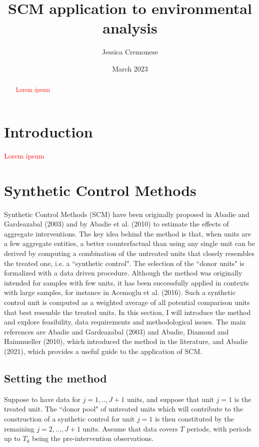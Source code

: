 \documentclass[12pt,a4paper,draft]{article}
\begin{document}
\begin{titlepage}
\title{SCM application to environmental analysis}
\author{Jessica Cremonese}
\date{March 2023}
\maketitle
\end{titlepage}

\tableofcontents

\newpage
\begin{abstract}
    \textcolor{red}{Lorem ipsum}
\end{abstract}
\newpage


\section{Introduction}
\textcolor{red}{Lorem ipsum}




\section{Synthetic Control Methods}
Synthetic Control Methods (SCM) have been originally proposed in Abadie and Gardeazabal 
(2003) and by Abadie et al. (2010) to estimate the effects of aggregate interventions.
The key idea behind the method is that, when units are a few aggregate entities, 
a better counterfactual than using any single unit can be derived by computing a 
combination of the untreated units that closely resembles the treated one, i.e. 
a ``synthetic control". The selection of the ``donor units" is formalized with a data
driven procedure.
Although the method was originally intended for samples with few units, it has been 
successfully applied in contexts with large samples, for instance in Acemoglu et 
al. (2016).
Such a synthetic control unit is computed as a weighted average of all potential 
comparison units that best resemble the treated units. In this section, I will 
introduce the method and explore feasibility, data requirements and methodological 
issues. 
The main references are Abadie and Gardeazabal (2003) and Abadie, Diamond and 
Hainmueller (2010), which introduced the method in the literature, and Abadie 
(2021), which provides a useful guide to the application of SCM.

\subsection{Setting the method}
Suppose to have data for $j=1,..,J+1$ units, and suppose that unit $j=1$ is the 
treated unit. The ``donor pool" of untreated units which will contribute to the 
construction of a synthetic control for unit $j=1$ is then constituted by the 
remaining $j=2,...,J+1$ units.
Assume that data covers $T$ periods, with periods up to $T_0$ being the 
pre-intervention observations.
\end{document}
